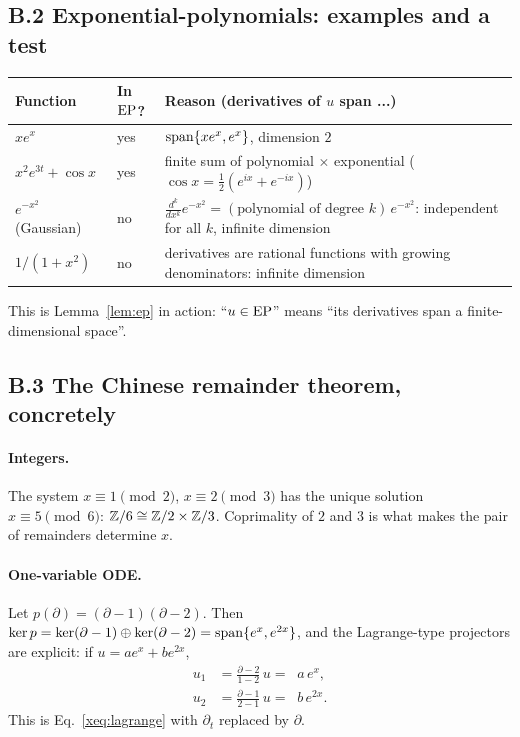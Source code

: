 \subsection*{B.2 Exponential-polynomials: examples and a test}
\begin{center}\small
\begin{tabular}{@{}L{5.4cm}L{2.3cm}L{6.8cm}@{}}
\toprule
Function & In $\mathrm{EP}$? & Reason (derivatives of $u$ span ...)\\\midrule
$xe^{x}$ & yes & $\operatorname{span}\{xe^x,e^x\}$, dimension $2$\\
$x^2e^{3t}+\cos x$ & yes & finite sum of polynomial $\times$ exponential ($\cos x=\tfrac12(e^{ix}+e^{-ix})$)\\
$e^{-x^2}$ (Gaussian) & no & $\frac{d^k}{dx^k}e^{-x^2}=(\text{polynomial of degree }k)\,e^{-x^2}$: independent for all $k$, infinite dimension\\
$1/(1+x^2)$ & no & derivatives are rational functions with growing denominators: infinite dimension\\
\bottomrule
\end{tabular}
\end{center}
This is Lemma~\ref{lem:ep} in action: ``$u\in\mathrm{EP}$'' means ``its derivatives span a finite-dimensional space''.

\subsection*{B.3 The Chinese remainder theorem, concretely}
\paragraph{Integers.} The system $x\equiv1\pmod2$, $x\equiv2\pmod3$ has the unique solution $x\equiv5\pmod6$: $\mathbb{Z}/6\cong\mathbb{Z}/2\times\mathbb{Z}/3$. Coprimality of $2$ and $3$ is what makes the pair of remainders determine $x$.

\paragraph{One-variable ODE.} Let $p(\partial)=(\partial-1)(\partial-2)$. Then $\ker p=\ker(\partial-1)\oplus\ker(\partial-2)=\operatorname{span}\{e^x,e^{2x}\}$, and the Lagrange-type projectors are explicit: if $u=ae^x+be^{2x}$,
\[
\begin{aligned}
u_1&=\frac{\partial-2}{1-2}\,u=\;\;a\,e^{x},\\
u_2&=\frac{\partial-1}{2-1}\,u=\;\;b\,e^{2x}.
\end{aligned}
\]
This is Eq.~\eqref{xeq:lagrange} with $\partial_t$ replaced by $\partial$.

